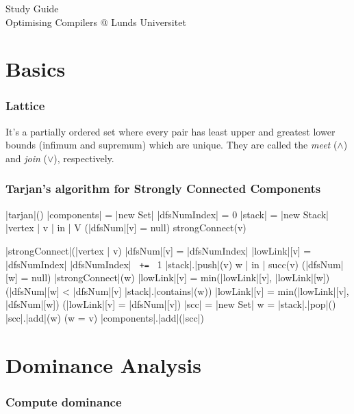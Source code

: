 \documentclass[a4paper,12pt, notitlepage]{article}
\newcommand{\negv}{\vspace{-0.7cm}}
\begin{document}
\begin{center}

{\Large{Study Guide\\ \bigskip
			Optimising Compilers @ Lunds Universitet}}
\vspace{1cm}
\end{center}
\section*{Basics}
\subsubsection*{Lattice}
It's a partially ordered set where every pair has least upper and greatest lower
bounds (infimum and supremum) which are unique. They are called the
\textit{meet} ($\land$) and \textit{join} ($\lor$), respectively.

\subsubsection*{Tarjan's algorithm for Strongly Connected Components}
\negv
\begin{program}
\PROC |tarjan|() \BODY
    |components| = |new Set|
    |dfsNumIndex| = 0
    |stack| = |new Stack|
    \FOREACH |vertex | v | in | V \DO
        \IF (|dfsNum|[v] = null) \AR*
            strongConnect(v)
        \FI \OD
\end{program} \negv
\begin{program}
\PROC |strongConnect|(|vertex | v) \BODY
    |dfsNum|[v] = |dfsNumIndex|
    |lowLink|[v] = |dfsNumIndex|
    |dfsNumIndex| \texttt{ += } 1
    |stack|.|push|(v)
    \FOREACH w | in | succ(v) \DO
        \IF (|dfsNum|[w] = null) \AR*
            |strongConnect|(w)
            |lowLink|[v] = min(|lowLink|[v], |lowLink|[w])
        \ELSIF (|dfsNum|[w] < |dfsNum|[v] \land |stack|.|contains|(w)) \AR*
            |lowLink|[v] = min(|lowLink|[v], |dfsNum|[w]) \FI
    \OD
    \IF (|lowLink|[v] = |dfsNum|[v]) \AR*
        |scc| = |new Set|
        \DOW
            w = |stack|.|pop|()
            |scc|.|add|(w)
        \ODW (w \not= v)
        |components|.|add|(|scc|)
    \FI
\end{program}

\section*{Dominance Analysis}
\subsubsection*{Compute dominance}
\end{document}

